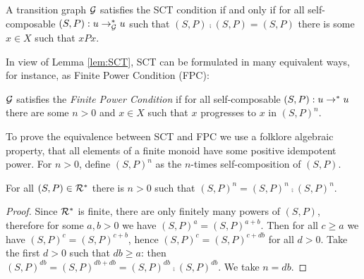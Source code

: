 \begin{lemma}
\label{lem:SCT}
A transition graph $\mathcal{G}$ satisfies the SCT condition if and only if for all self-composable 
$(S,P) : u \to_{\mathcal{G}}^* u$ such that 
$(S,P) \comp (S,P) = (S,P)$ there is some $x \in X$ such that $x P x$.
\end{lemma}

In view of Lemma \ref{lem:SCT}, SCT can be formulated in many equivalent ways, for instance, as Finite Power Condition (FPC):

\begin{definition}
\label{def:FPC}
$\mathcal{G}$ satisfies the {\em Finite Power Condition} if for all self-composable 
$(S,P) : u \to^* u$ there are some $n > 0 $ and
$x \in X$ such that $x$ progresses to $x$ in $(S,P)^n$.
\end{definition}


To prove the equivalence between SCT and FPC we use a folklore
algebraic property, that all elements of a finite monoid have some positive idempotent power. For $n > 0$, define $(S,P)^n$ as the $n$-times
self-composition of $(S,P)$.

\begin{lemma}
\label{lem:idempotent-power}
For all $(S,P) \in \mathcal{R}^*$ there is $n > 0$ such that $(S,P)^n = (S,P)^n \comp (S,P)^n$.
\end{lemma}

\begin{proof}
Since $\mathcal{R}^*$ is finite, there are only finitely many powers of $(S,P)$, therefore 
for some $a,b>0$ we have $(S,P)^a = (S,P)^{a+b}$. Then for all $c \ge a$ we have $(S,P)^c = (S,P)^{c+b}$,
hence $(S,P)^c = (S,P)^{c+db}$ for all $d>0$. Take the first $d>0$ such that $db \ge a$: then 
$(S,P)^{db} = (S,P)^{db+db} = (S,P)^{db} \comp (S,P)^{db}$. We take $n=db$.
\end{proof}


